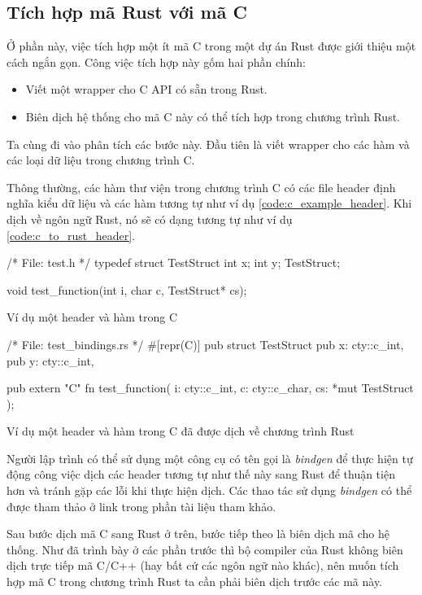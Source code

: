 \subsection{Tích hợp mã Rust với mã C}
Ở phần này, việc tích hợp một ít mã C trong một dự án Rust được giới thiệu một cách ngắn gọn.
Công việc tích hợp này gốm hai phần chính:
\begin{itemize}
\item Viết một wrapper cho C API có sẵn trong Rust.
\item Biên dịch hệ thống cho mã C này có thể tích hợp trong chương trình Rust.
\end{itemize}

Ta cùng đi vào phân tích các bước này.
Đầu tiên là viết wrapper cho các hàm và các loại dữ liệu trong chương trình C.

Thông thường, các hàm thư viện trong chương trình C có các file header định nghĩa kiểu dữ liệu và các hàm tương tự như ví dụ \ref{code:c_example_header}.
Khi dịch về ngôn ngữ Rust, nó sẽ có dạng tương tự như ví dụ \ref{code:c_to_rust_header}.
\begin{listing}
\begin{ccode}
/* File: test.h */
typedef struct TestStruct {
    int x;
    int y;
} TestStruct;

void test_function(int i, char c, TestStruct* cs);
\end{ccode}
\caption{Ví dụ một header và hàm trong C}
\label{code:c_example_header}
\end{listing}

\begin{listing}
\begin{rustcode}
/* File: test_bindings.rs */
#[repr(C)]
pub struct TestStruct {
    pub x: cty::c_int,
    pub y: cty::c_int,
}

pub extern "C" fn test_function(
    i: cty::c_int,
    c: cty::c_char,
    cs: *mut TestStruct
);
\end{rustcode}
\caption{Ví dụ một header và hàm trong C đã được dịch về chương trình Rust}
\label{code:c_to_rust_header}
\end{listing}

Người lập trình có thể sử dụng một công cụ có tên gọi là \emph{bindgen} để thực hiện tự động công việc dịch các header tương tự như thế này sang Rust để thuận tiện hơn và tránh gặp các lỗi khi thực hiện dịch.
Các thao tác sử dụng \emph{bindgen} có thể được tham thảo ở link trong phần tài liệu tham khảo.

Sau bước dịch mã C sang Rust ở trên, bước tiếp theo là biên dịch mã cho hệ thống.
Như đã trình bày ở các phần trước thì bộ compiler của Rust không biên dịch trực tiếp mã C/C++ (hay bất cứ các ngôn ngữ nào khác), nên muốn tích hợp mã C trong chương trình Rust ta cần phải biên dịch trước các mã này.

